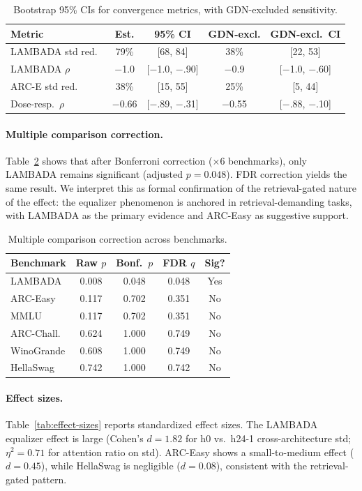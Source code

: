 \documentclass[11pt,a4paper]{article}
\begin{document}
\begin{table}[t]
\centering
\small
\caption{Bootstrap 95\% CIs for convergence metrics, with GDN-excluded sensitivity.}
\label{tab:bootstrap}
\begin{tabular}{@{}lcccc@{}}
\toprule
Metric & Est. & 95\% CI & GDN-excl. & GDN-excl.\ CI \\
\midrule
LAMBADA std red.\ & 79\% & [68, 84] & 38\% & [22, 53] \\
LAMBADA $\rho$ & $-$1.0 & [$-$1.0, $-$.90] & $-$0.9 & [$-$1.0, $-$.60] \\
ARC-E std red.\ & 38\% & [15, 55] & 25\% & [5, 44] \\
Dose-resp.\ $\rho$ & $-$0.66 & [$-$.89, $-$.31] & $-$0.55 & [$-$.88, $-$.10] \\
\bottomrule
\end{tabular}
\end{table}

\paragraph{Multiple comparison correction.}
Table~\ref{tab:correction} shows that after Bonferroni correction ($\times 6$ benchmarks), only LAMBADA remains significant (adjusted $p{=}0.048$). FDR correction yields the same result. We interpret this as formal confirmation of the retrieval-gated nature of the effect: the equalizer phenomenon is anchored in retrieval-demanding tasks, with LAMBADA as the primary evidence and ARC-Easy as suggestive support.

\begin{table}[t]
\centering
\small
\caption{Multiple comparison correction across benchmarks.}
\label{tab:correction}
\begin{tabular}{@{}lcccc@{}}
\toprule
Benchmark & Raw $p$ & Bonf.\ $p$ & FDR $q$ & Sig? \\
\midrule
LAMBADA & 0.008 & 0.048 & 0.048 & Yes \\
ARC-Easy & 0.117 & 0.702 & 0.351 & No \\
MMLU & 0.117 & 0.702 & 0.351 & No \\
ARC-Chall. & 0.624 & 1.000 & 0.749 & No \\
WinoGrande & 0.608 & 1.000 & 0.749 & No \\
HellaSwag & 0.742 & 1.000 & 0.742 & No \\
\bottomrule
\end{tabular}
\end{table}

\paragraph{Effect sizes.}
Table~\ref{tab:effect-sizes} reports standardized effect sizes. The LAMBADA equalizer effect is large (Cohen's $d{=}1.82$ for h0 vs.\ h24-1 cross-architecture std; $\eta^2{=}0.71$ for attention ratio on std). ARC-Easy shows a small-to-medium effect ($d{=}0.45$), while HellaSwag is negligible ($d{=}0.08$), consistent with the retrieval-gated pattern.
\end{document}
